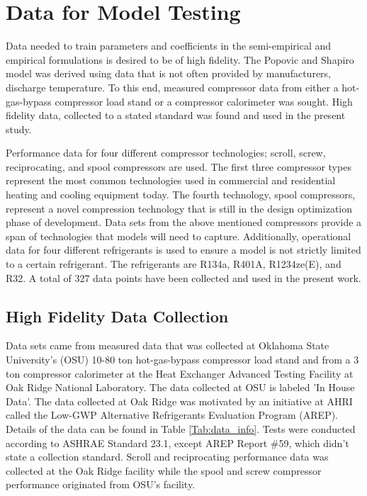 \documentclass[preprint,11pt,authoryear]{elsarticle}
\begin{document}
\section{Data for Model Testing}

Data needed to train parameters and coefficients in the semi-empirical and empirical formulations is desired to be of high fidelity. The Popovic and Shapiro model was derived using data that is not often provided by manufacturers, discharge temperature. To this end, measured compressor data from either a hot-gas-bypass compressor load stand or a compressor calorimeter was sought. High fidelity data, collected to a stated standard was found and used in the present study. 

Performance data for four different compressor technologies; scroll, screw, reciprocating, and spool compressors are used. The first three compressor types represent the most common technologies used in commercial and residential heating and cooling equipment today. The fourth technology, spool compressors, represent a novel compression technology that is still in the design optimization phase of development. Data sets from the above mentioned compressors provide a span of technologies that models will need to capture. Additionally, operational data for four different refrigerants is used to ensure a model is not strictly limited to a certain refrigerant. The refrigerants are R134a, R401A, R1234ze(E), and R32. A total of 327 data points have been collected and used in the present work.

\subsection{High Fidelity Data Collection}

Data sets came from measured data that was collected at Oklahoma State University's (OSU) 10-80 ton hot-gas-bypass compressor load stand and from a 3 ton compressor calorimeter at the Heat Exchanger Advanced Testing Facility at Oak Ridge National Laboratory. The data collected at OSU is labeled 'In House Data'. The data collected at Oak Ridge was motivated by an initiative at AHRI called the Low-GWP Alternative Refrigerants Evaluation Program (AREP). Details of the data can be found in Table \ref{Tab:data_info}. Tests were conducted according to ASHRAE Standard 23.1, except AREP Report \#59, which didn't state a collection standard. Scroll and reciprocating performance data was collected at the Oak Ridge facility while the spool and screw compressor performance originated from OSU's facility. 
\end{document}
